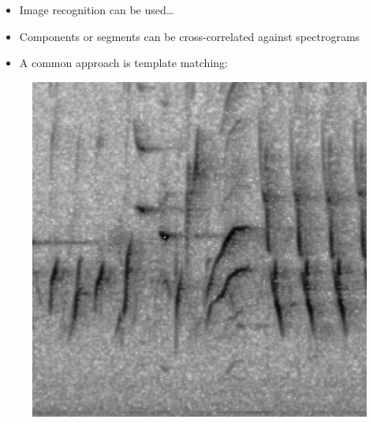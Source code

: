 \documentclass[t, xcolor={dvipsnames}]{beamer}
\begin{document}
\begin{frame}[fragile]
  \vspace{0.5cm}
  \begin{addmargin}{0.5cm}
    \begin{itemize}
      \item Image recognition can be used\ldots
      \item Components or segments can be cross-correlated against spectrograms
      \item A common approach is template matching:
    \end{itemize}
  \end{addmargin}

    \begin{figure}[!tbp]
      \centering
      \begin{minipage}[c]{0.3\textwidth}
        \includegraphics[width=\textwidth]{img/specgram}
      \end{minipage}
      \hfill
      \begin{minipage}[c]{0.3\textwidth}

\end{minipage}
\end{figure}
\end{frame}
\end{document}
